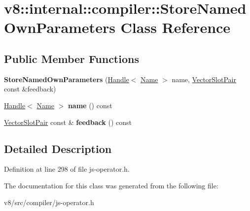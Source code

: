 \hypertarget{classv8_1_1internal_1_1compiler_1_1StoreNamedOwnParameters}{}\section{v8\+:\+:internal\+:\+:compiler\+:\+:Store\+Named\+Own\+Parameters Class Reference}
\label{classv8_1_1internal_1_1compiler_1_1StoreNamedOwnParameters}
\subsection*{Public Member Functions}
\begin{DoxyCompactItemize}
\item 
\mbox{\label{classv8_1_1internal_1_1compiler_1_1StoreNamedOwnParameters_afcc849d02ee709d4b4a738a0a4695416}} 
{\bfseries Store\+Named\+Own\+Parameters} (\mbox{\hyperlink{classv8_1_1internal_1_1Handle}{Handle}}$<$ \mbox{\hyperlink{classv8_1_1internal_1_1Name}{Name}} $>$ name, \mbox{\hyperlink{classv8_1_1internal_1_1VectorSlotPair}{Vector\+Slot\+Pair}} const \&feedback)
\item 
\mbox{\label{classv8_1_1internal_1_1compiler_1_1StoreNamedOwnParameters_a91e1a584cf706b6f6608d12c81f15855}} 
\mbox{\hyperlink{classv8_1_1internal_1_1Handle}{Handle}}$<$ \mbox{\hyperlink{classv8_1_1internal_1_1Name}{Name}} $>$ {\bfseries name} () const
\item 
\mbox{\label{classv8_1_1internal_1_1compiler_1_1StoreNamedOwnParameters_a24c7d1ff885195b7785ea640b8bbebe9}} 
\mbox{\hyperlink{classv8_1_1internal_1_1VectorSlotPair}{Vector\+Slot\+Pair}} const  \& {\bfseries feedback} () const
\end{DoxyCompactItemize}


\subsection{Detailed Description}


Definition at line 298 of file js-\/operator.\+h.



The documentation for this class was generated from the following file\+:\begin{DoxyCompactItemize}
\item 
v8/src/compiler/js-\/operator.\+h\end{DoxyCompactItemize}
